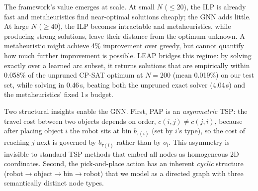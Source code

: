 \documentclass[review,times]{elsarticle}
\begin{document}
The framework's value emerges at scale. At small $N$ (${\le}20$), the ILP is already fast and metaheuristics find near-optimal solutions cheaply; the GNN adds little. At large $N$ (${\ge}40$), the ILP becomes intractable and metaheuristics, while producing strong solutions, leave their distance from the optimum unknown. A metaheuristic might achieve 4\% improvement over greedy, but cannot quantify how much further improvement is possible. LEAP bridges this regime: by solving exactly over a learned arc subset, it returns solutions that are empirically within 0.058\% of the unpruned CP-SAT optimum at $N{=}200$ (mean 0.019\%) on our test set, while solving in 0.46\,s, beating both the unpruned exact solver (4.04\,s) and the metaheuristics' fixed 1\,s budget.

Two structural insights enable the GNN. First, PAP is an \emph{asymmetric} TSP: the travel cost between two objects depends on order, $c(i,j)\neq c(j,i)$, because after placing object $i$ the robot sits at bin $b_{\tau(i)}$ (set by $i$'s type), so the cost of reaching $j$ next is governed by $b_{\tau(i)}$ rather than by $o_i$. This asymmetry is invisible to standard TSP methods that embed all nodes as homogeneous 2D coordinates. Second, the pick-and-place action has an inherent \emph{cyclic} structure (robot$\to$object$\to$bin$\to$robot) that we model as a directed graph with three semantically distinct node types.
\end{document}
